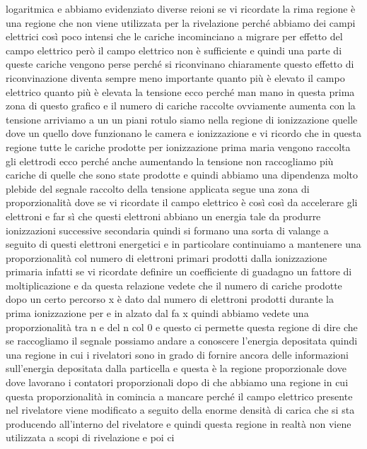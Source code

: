 {logaritmica e abbiamo evidenziato diverse reioni se vi ricordate la rima regione è una regione che non viene utilizzata per la rivelazione perché abbiamo dei campi elettrici così poco intensi che le cariche incominciano a migrare per effetto del campo elettrico però il campo elettrico non è sufficiente e quindi una parte di queste cariche vengono perse perché si riconvinano chiaramente questo effetto di riconvinazione diventa sempre meno importante quanto più è elevato il campo elettrico quanto più è elevata la tensione ecco perché man mano in questa prima zona di questo grafico e il numero di cariche raccolte ovviamente aumenta con la tensione arriviamo a un un piani rotulo siamo nella regione di ionizzazione quelle dove un quello dove funzionano le camera e ionizzazione e vi ricordo che in questa regione tutte le cariche prodotte per ionizzazione prima maria vengono raccolta gli elettrodi ecco perché anche aumentando la tensione non raccogliamo più cariche di quelle che sono state prodotte e quindi abbiamo una dipendenza molto plebide del segnale raccolto della tensione applicata segue una zona di proporzionalità dove se vi ricordate il campo elettrico è così così da accelerare gli elettroni e far sì che questi elettroni abbiano un energia tale da produrre ionizzazioni successive secondaria quindi si formano una sorta di valange a seguito di questi elettroni energetici e in particolare continuiamo a mantenere una proporzionalità col numero di elettroni primari prodotti dalla ionizzazione primaria infatti se vi ricordate definire un coefficiente di guadagno un fattore di moltiplicazione e da questa relazione vedete che il numero di cariche prodotte dopo un certo percorso x è dato dal numero di elettroni prodotti durante la prima ionizzazione per e in alzato dal fa x quindi abbiamo vedete una proporzionalità tra n e del n col 0 e questo ci permette questa regione di dire che se raccogliamo il segnale possiamo andare a conoscere l'energia depositata quindi una regione in cui i rivelatori sono in grado di fornire ancora delle informazioni sull'energia depositata dalla particella e questa è la regione proporzionale dove dove lavorano i contatori proporzionali dopo di che abbiamo una regione in cui questa proporzionalità in comincia a mancare perché il campo elettrico presente nel rivelatore viene modificato a seguito della enorme densità di carica che si sta producendo all'interno del rivelatore e quindi questa regione in realtà non viene utilizzata a scopi di rivelazione e poi ci 

}
